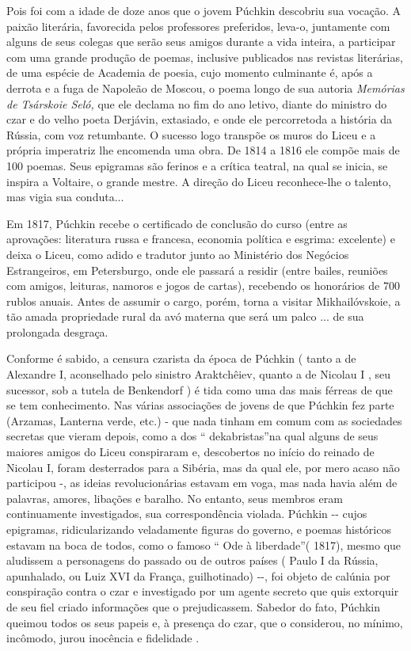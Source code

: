 Pois foi com a idade de doze anos que o jovem Púchkin descobriu sua
vocação. A paixão literária, favorecida pelos professores preferidos,
leva-o, juntamente com alguns de seus colegas que serão seus amigos
durante a vida inteira, a participar com uma grande produção de poemas,
inclusive publicados nas revistas literárias, de uma espécie de Academia
de poesia, cujo momento culminante é, após a derrota e a fuga de
Napoleão de Moscou, o poema longo de sua autoria \emph{Memórias de
Tsárskoie Seló,} que ele declama no fim do ano letivo, diante do
ministro do czar e do velho poeta Derjávin, extasiado, e onde ele
percorretoda a história da Rússia, com voz retumbante. O sucesso logo
transpõe os muros do Liceu e a própria imperatriz lhe encomenda uma
obra. De 1814 a 1816 ele compõe mais de 100 poemas. Seus epigramas são
ferinos e a crítica teatral, na qual se inicia, se inspira a Voltaire, o
grande mestre. A direção do Liceu reconhece-lhe o talento, mas vigia sua
conduta...

Em 1817, Púchkin recebe o certificado de conclusão do curso (entre as
aprovações: literatura russa e francesa, economia política e esgrima:
excelente) e deixa o Liceu, como adido e tradutor junto ao Ministério
dos Negócios Estrangeiros, em Petersburgo, onde ele passará a residir
(entre bailes, reuniões com amigos, leituras, namoros e jogos de
cartas), recebendo os honorários de 700 rublos anuais. Antes de assumir
o cargo, porém, torna a visitar Mikhailóvskoie, a tão amada propriedade
rural da avó materna que será um palco ... de sua prolongada desgraça.

Conforme é sabido, a censura czarista da época de Púchkin ( tanto a de
Alexandre I, aconselhado pelo sinistro Araktchêiev, quanto a de Nicolau
I , seu sucessor, sob a tutela de Benkendorf ) é tida como uma das mais
férreas de que se tem conhecimento. Nas várias associações de jovens de
que Púchkin fez parte (Arzamas, Lanterna verde, etc.) - que nada tinham
em comum com as sociedades secretas que vieram depois, como a dos ``
dekabristas''na qual alguns de seus maiores amigos do Liceu conspiraram
e, descobertos no início do reinado de Nicolau I, foram desterrados para
a Sibéria, mas da qual ele, por mero acaso não participou -, as ideias
revolucionárias estavam em voga, mas nada havia além de palavras,
amores, libações e baralho. No entanto, seus membros eram continuamente
investigados, sua correspondência violada. Púchkin -\/- cujos epigramas,
ridicularizando veladamente figuras do governo, e poemas históricos
estavam na boca de todos, como o famoso `` Ode à liberdade''( 1817),
mesmo que aludissem a personagens do passado ou de outros países ( Paulo
I da Rússia, apunhalado, ou Luiz XVI da França, guilhotinado) -\/-, foi
objeto de calúnia por conspiração contra o czar e investigado por um
agente secreto que quis extorquir de seu fiel criado informações que o
prejudicassem. Sabedor do fato, Púchkin queimou todos os seus papeis e,
à presença do czar, que o considerou, no mínimo, incômodo, jurou
inocência e fidelidade .

